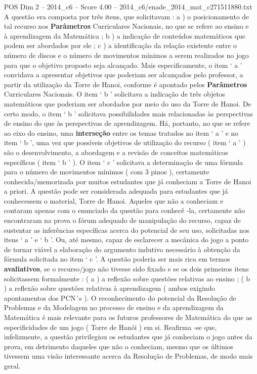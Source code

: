 \begin{textsample}{POS Dim 2 – 2014\_c6 – Score 4.00 – 2014\_c6/enade\_2014\_mat\_c271511880.txt}
A questão era composta por três itens, que solicitavam : a ) o posicionamento de tal recurso nos \textbf{Parâmetros} Curriculares Nacionais, no que se refere ao ensino e à aprendizagem da Matemática ; b ) a indicação de conteúdos matemáticos que podem ser abordados por ele ; c ) a identificação da relação existente entre o número de discos e o número de movimentos mínimos a serem realizados no jogo para que o objetivo proposto seja alcançado.
Mais especificamente, o item ‘ a ’ convidava a apresentar objetivos que poderiam ser alcançados pelo professor, a partir da utilização da Torre de Hanoi, conforme é apontado pelos \textbf{Parâmetros} Curriculares Nacionais.
O item ‘ b ’ solicitava a indicação de três objetos matemáticos que poderiam ser abordados por meio do uso da Torre de Hanoi.
De certo modo, o item ‘ b ’ solicitava possibilidades mais relacionadas às perspectivas de ensino do que às perspectivas de aprendizagem.
Há, portanto, no que se refere ao eixo do ensino, uma \textbf{interseção} entre os temas tratados no item ‘ a ’ e no item ‘ b ’, uma vez que possíveis objetivos de utilização do recurso ( item ‘ a ’ ) são o desenvolvimento, a abordagem e a revisão de conceitos matemáticos específicos ( item ‘ b ’ ).
O item ‘ c ’ solicitava a determinação de uma fórmula para o número de movimentos mínimos ( com 3 pinos ), certamente conhecida/memorizada por muitos estudantes que já conheciam a Torre de Hanoi a priori.
A questão pode ser considerada adequada para estudantes que já conhecessem o material, Torre de Hanoi.
Aqueles que não a conheciam e contaram apenas com o enunciado da questão para conhecê -la, certamente não encontraram na prova o fórum adequado de manipulação do recurso, capaz de sustentar as inferências específicas acerca do potencial de seu uso, solicitadas nos itens ‘ a ’ e ‘ b ’.
Ou, até mesmo, capaz de esclarecer a mecânica do jogo a ponto de tornar viável a elaboração do argumento indutivo necessário à obtenção da fórmula solicitada no item ‘ c ’.
A questão poderia ser mais rica em termos \textbf{avaliativos}, se o recurso/jogo não tivesse sido fixado e se os dois primeiros itens solicitassem formalmente : ( a ) a reflexão sobre questões relativas ao ensino ; ( b ) a reflexão sobre questões relativas à aprendizagem ( ambos exigindo apontamentos dos PCN´s ).
O reconhecimento do potencial da Resolução de Problemas e da Modelagem no processo de ensino e da aprendizagem da Matemática é mais relevante para os futuros professores de Matemática do que as especificidades de um jogo ( Torre de Hanói ) em si.
Reafirma -se que, infelizmente, a questão privilegiou os estudantes que já conheciam o jogo antes da prova, em detrimento daqueles que não o conheciam, mesmo que os últimos tivessem uma visão interessante acerca da Resolução de Problemas, de modo mais geral.

\end{textsample}
